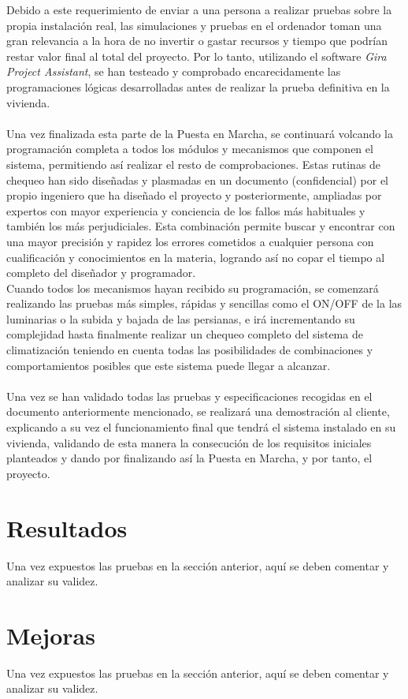 Debido a este requerimiento de enviar a una persona a realizar pruebas sobre la propia instalación real, las simulaciones y pruebas en el ordenador toman una gran relevancia a la hora de no invertir o gastar recursos y tiempo que podrían restar valor final al total del proyecto. Por lo tanto, utilizando el software \textit{Gira Project Assistant}, se han testeado y comprobado encarecidamente las programaciones lógicas desarrolladas antes de realizar la prueba definitiva en la vivienda.\\\\

Una vez finalizada esta parte de la Puesta en Marcha, se continuará volcando la programación completa a todos los módulos y mecanismos que componen el sistema, permitiendo así realizar el resto de comprobaciones. Estas rutinas de chequeo han sido diseñadas y plasmadas en un documento (confidencial) por el propio ingeniero que ha diseñado el proyecto y posteriormente, ampliadas por expertos con mayor experiencia y conciencia de los fallos más habituales y también los más perjudiciales. Esta combinación permite buscar y encontrar con una mayor precisión y rapidez los errores cometidos a cualquier persona con cualificación y conocimientos en la materia, logrando así no copar el tiempo al completo del diseñador y programador. \\

Cuando todos los mecanismos hayan recibido su programación, se comenzará realizando las pruebas más simples, rápidas y sencillas como el ON/OFF de la las luminarias o la subida y bajada de las persianas, e irá incrementando su complejidad hasta finalmente realizar un chequeo completo del sistema de climatización teniendo en cuenta todas las posibilidades de combinaciones y comportamientos posibles que este sistema puede llegar a alcanzar. \\\\
Una vez se han validado todas las pruebas y especificaciones recogidas en el documento anteriormente mencionado, se realizará una demostración al cliente, explicando a su vez el funcionamiento final que tendrá el sistema instalado en su vivienda, validando de esta manera la consecución de los requisitos iniciales planteados y dando por finalizando así la Puesta en Marcha, y por tanto, el proyecto.


\section{Resultados}

Una vez expuestos las pruebas en la sección anterior, aquí se deben comentar y analizar su validez.

\section{Mejoras}

Una vez expuestos las pruebas en la sección anterior, aquí se deben comentar y analizar su validez.